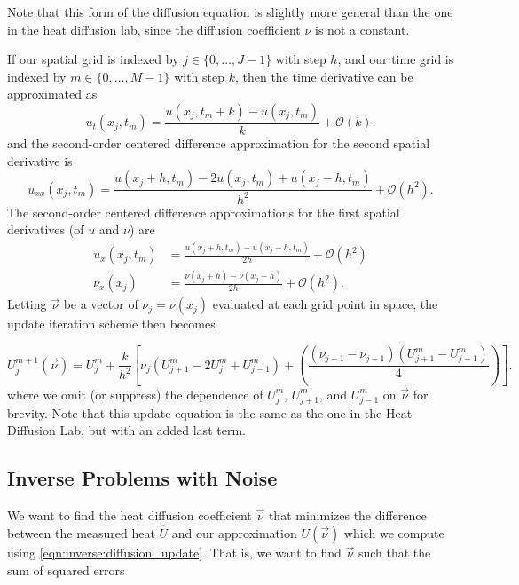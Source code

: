 Note that this form of the diffusion equation is slightly more general than the one in the heat diffusion lab, since the diffusion coefficient $\nu$ is not a constant. 

If our spatial grid is indexed by $j\in\{0, \ldots, J-1\}$ with step $h$, and our time grid is indexed by $m\in\{0, \ldots, M-1\}$ with step $k$, then the time derivative can be approximated as
\begin{equation*}
	u_t(x_j, t_m) = \frac{u(x_j, t_m + k) - u(x_j, t_m)}{k} + \mathcal{O}(k).
\end{equation*}
and the second-order centered difference approximation for the second spatial derivative is
\begin{equation*}
	u_{xx}(x_j,t_m) = \frac{u(x_j + h,t_m )-2 u(x_j,t_m)+ u(x_j - h,t_m)}{h^2} + \mathcal{O}(h^2).
\end{equation*}
The second-order centered difference approximations for the first spatial derivatives (of $u$ and $\nu$) are
\begin{align*}
	u_x(x_j, t_m) &= \frac{u(x_j + h, t_m) - u(x_j - h, t_m)}{2h} + \mathcal{O}(h^2)\\
	\nu_x(x_j) &= \frac{\nu(x_j + h) - \nu(x_j - h)}{2h} + \mathcal{O}(h^2).
\end{align*}
Letting $\vec \nu$ be a vector of $\nu_j = \nu(x_j)$ evaluated at each grid point in space, the update iteration scheme then becomes

\begin{equation}
U_{j}^{m+1}(\vec \nu) = U_{j}^{m} + \frac{ k}{h^2} \left[ \nu_j(U_{j+1}^m - 2U_{j}^{m} + U_{j-1}^{m} ) + \left(\frac{(\nu_{j+1}-\nu_{j-1})(U^m_{j+1}-U^m_{j-1})}{4}\right)\right].
\label{eqn:inverse:diffusion_update}
\end{equation}
where we omit (or suppress) the dependence of $U_j^m$, $U_{j+1}^m$, and $U_{j-1}^m$ on $\vec \nu$ for brevity.
Note that this update equation is the same as the one in the Heat Diffusion Lab, but with an added last term.

\subsection*{Inverse Problems with Noise}

We want to find the heat diffusion coefficient $\vec \nu$ that minimizes the difference between the measured heat $\hat U$ and our approximation $U(\vec \nu)$ which we compute using \eqref{eqn:inverse:diffusion_update}. That is, we want to find $\vec \nu$ such that the sum of squared errors

